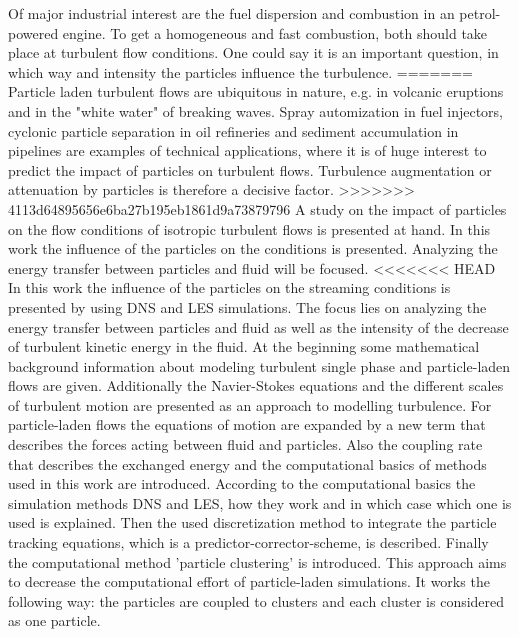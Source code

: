 \documentclass[11pt,a4paper,openany,oneside,parskip=half*]{article}
\begin{document}
Of major industrial interest are the fuel dispersion and combustion in an petrol-powered engine. To get a homogeneous and fast combustion, both should take place at turbulent flow conditions. One could say it is an important question, in which way and intensity the particles influence the turbulence.
=======
Particle laden turbulent flows are ubiquitous in nature, e.g. in volcanic eruptions and in the "white water" of breaking waves.
Spray automization in fuel injectors, cyclonic particle separation in oil refineries and sediment accumulation in pipelines are examples of technical applications, where it is of huge interest to predict the impact of particles on turbulent flows.
Turbulence augmentation or attenuation by particles is therefore a decisive factor.
>>>>>>> 4113d64895656e6ba27b195eb1861d9a73879796
\newline
A study on the impact of particles on the flow conditions of isotropic turbulent flows is presented at hand.
In this work the influence of the particles on the conditions is presented. Analyzing the energy transfer between particles and fluid will be focused.  
\newline
<<<<<<< HEAD
In this work the influence of the particles on the streaming conditions is presented by using DNS and LES simulations. The focus lies on analyzing the energy transfer between particles and fluid as well as the intensity of the decrease of turbulent kinetic energy in the fluid.  
At the beginning some mathematical background information about modeling turbulent single phase and particle-laden flows are given. 
Additionally the Navier-Stokes equations and the different scales of turbulent motion are presented as an approach to modelling turbulence. For particle-laden flows the equations of motion are expanded by a new term that describes the forces acting between fluid and particles. 
Also the coupling rate that describes the exchanged energy and the computational basics of methods used in this work are introduced. 
According to the computational basics the simulation methods DNS and LES, how they work and in which case which one is used is explained.
Then the used discretization method to integrate the particle tracking equations, which is a predictor-corrector-scheme, is described.     
Finally the computational method 'particle clustering' is introduced. This approach aims to decrease the computational effort of particle-laden simulations. It works the following way: the particles are coupled to clusters and each cluster is considered as one particle.
\newline
\end{document}
